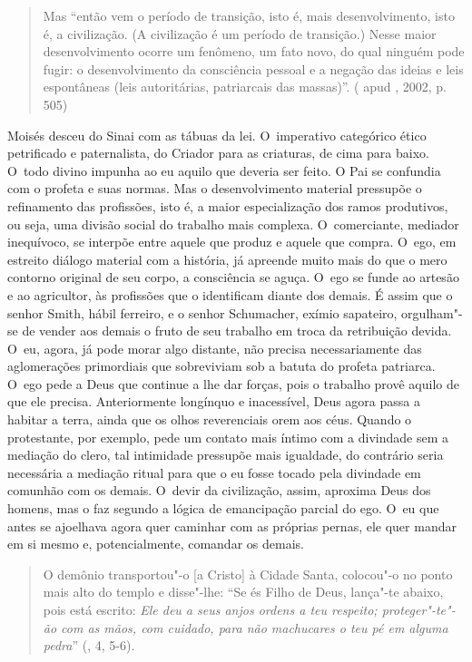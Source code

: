 \begin{quote}
Mas ``então vem o período de transição, isto é, mais desenvolvimento,
isto é, a civilização. (A civilização é um período de transição.) Nesse
maior desenvolvimento ocorre um fenômeno, um fato novo, do qual ninguém
pode fugir: o desenvolvimento da consciência pessoal e a negação das
ideias e leis espontâneas (leis autoritárias, patriarcais das massas)''.
( apud , 2002, p. 505)
\end{quote}

Moisés desceu do Sinai com as tábuas da lei. O~imperativo categórico
ético petrificado e paternalista, do Criador para as criaturas, de cima
para baixo. O~todo divino impunha ao eu aquilo que deveria ser feito. O
Pai se confundia com o profeta e suas normas. Mas o desenvolvimento
material pressupõe o refinamento das profissões, isto é, a maior
especialização dos ramos produtivos, ou seja, uma divisão social do
trabalho mais complexa. O~comerciante, mediador inequívoco, se interpõe
entre aquele que produz e aquele que compra. O~ego, em estreito diálogo
material com a história, já apreende muito mais do que o mero contorno
original de seu corpo, a consciência se aguça. O~ego se funde ao artesão
e ao agricultor, às profissões que o identificam diante dos demais. É
assim que o senhor Smith, hábil ferreiro, e o senhor Schumacher, exímio
sapateiro, orgulham"-se de vender aos demais o fruto de seu trabalho em
troca da retribuição devida. O~eu, agora, já pode morar algo distante,
não precisa necessariamente das aglomerações primordiais que sobreviviam
sob a batuta do profeta patriarca. O~ego pede a Deus que continue a lhe
dar forças, pois o trabalho provê aquilo de que ele precisa.
Anteriormente longínquo e inacessível, Deus agora passa a habitar a
terra, ainda que os olhos reverenciais orem aos céus. Quando o
protestante, por exemplo, pede um contato mais íntimo com a divindade
sem a mediação do clero, tal intimidade pressupõe mais igualdade, do
contrário seria necessária a mediação ritual para que o eu fosse tocado
pela divindade em comunhão com os demais. O~devir da civilização, assim,
aproxima Deus dos homens, mas o faz segundo a lógica de emancipação
parcial do ego. O~eu que antes se ajoelhava agora quer caminhar com as
próprias pernas, ele quer mandar em si mesmo e, potencialmente, comandar
os demais.

\begin{quote}
O demônio transportou"-o {[}a Cristo{]} à Cidade Santa, colocou"-o no
ponto mais alto do templo e disse"-lhe: ``Se és Filho de Deus, lança"-te
abaixo, pois está escrito: \emph{Ele deu a seus anjos ordens a teu
respeito; proteger"-te"-ão com as mãos, com cuidado, para não machucares o
teu pé em alguma pedra}'' (, 4, 5-6).
\end{quote}

